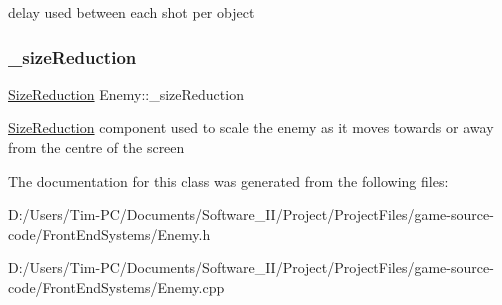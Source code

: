 delay used between each shot per object \mbox{\label{class_enemy_af8b4d39339f59407b7fd9cd1d6246860}} 
\subsubsection{\texorpdfstring{\+\_\+size\+Reduction}{\_sizeReduction}}
{\footnotesize\ttfamily \hyperlink{class_size_reduction}{Size\+Reduction} Enemy\+::\+\_\+size\+Reduction\hspace{0.3cm}{\ttfamily [private]}}

\hyperlink{class_size_reduction}{Size\+Reduction} component used to scale the enemy as it moves towards or away from the centre of the screen 

The documentation for this class was generated from the following files\+:\begin{DoxyCompactItemize}
\item 
D\+:/\+Users/\+Tim-\/\+P\+C/\+Documents/\+Software\+\_\+\+I\+I/\+Project/\+Project\+Files/game-\/source-\/code/\+Front\+End\+Systems/Enemy.\+h\item 
D\+:/\+Users/\+Tim-\/\+P\+C/\+Documents/\+Software\+\_\+\+I\+I/\+Project/\+Project\+Files/game-\/source-\/code/\+Front\+End\+Systems/Enemy.\+cpp\end{DoxyCompactItemize}
